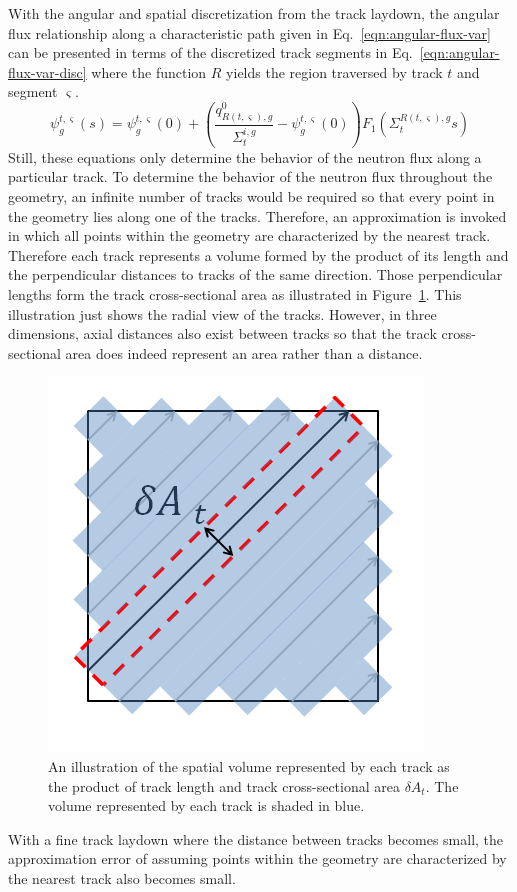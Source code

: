With the angular and spatial discretization from the track laydown, the angular flux relationship along a characteristic path given in Eq.~\ref{eqn:angular-flux-var} can be presented in terms of the discretized track segments in Eq.~\ref{eqn:angular-flux-var-disc} where the function $R$ yields the region traversed by track $t$ and segment $\varsigma$. 
\begin{dmath}
	\psi_g^{t,\varsigma}(s) = \psi^{t,\varsigma}_g(0) + \left( \frac{q^0_{R(t,\varsigma),g}}{\Sigma_{t}^{i,g}} - \psi_g^{t,\varsigma}(0) \right) F_1\left(\Sigma_{t}^{R(t,\varsigma),g} s \right)
	\label{eqn:angular-flux-var-disc}
\end{dmath}
Still, these equations only determine the behavior of the neutron flux along a particular track. To determine the behavior of the neutron flux throughout the geometry, an infinite number of tracks would be required so that every point in the geometry lies along one of the tracks. Therefore, an approximation is invoked in which all points within the geometry are characterized by the nearest track. Therefore each track represents a volume formed by the product of its length and the perpendicular distances to tracks of the same direction. Those perpendicular lengths form the track cross-sectional area as illustrated in Figure~\ref{fig:track-cross-section}. This illustration just shows the radial view of the tracks. However, in three dimensions, axial distances also exist between tracks so that the track cross-sectional area does indeed represent an area rather than a distance.
\begin{figure}[h!]
	\centering
	\includegraphics[width=0.6\linewidth]{figures/track-cross-sectional-area.PNG}
	\caption[]{An illustration of the spatial volume represented by each track as the product of track length and track cross-sectional area $\delta A_t$. The volume represented by each track is shaded in blue.}
	\label{fig:track-cross-section}
\end{figure}
With a fine track laydown where the distance between tracks becomes small, the approximation error of assuming points within the geometry are characterized by the nearest track also becomes small. 

